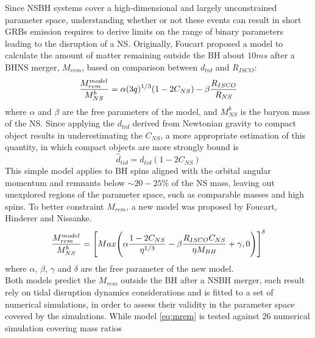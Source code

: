 \documentclass[binding=0.6cm, LaM]{sapthesis}
\begin{document}
        Since NSBH systems cover a high-dimensional and largely unconstrained parameter space,
        understanding whether or not these events can result in short GRBs emission requires to
        derive limits on the range of binary parameters leading to the disruption of a NS.
        Originally, Foucart proposed a model to calculate the amount of matter remaining
        outside the BH about $10ms$ after a BHNS merger, $M_{rem}$, based on comparison
        between $d_{tid}$ and $R_{ISCO}$:
                \begin{equation}
                \label{eq:mrem}
                        {{M_{rem}^{model}} \over {M^b_{NS}}} = \alpha(3q)^{1/3}(1 - 2C_{NS}) - \beta{{R_{ISCO}} \over {R_{NS}}}
                \end{equation}
        where $\alpha$ and $\beta$ are the free parameters of the model,
        and $M^b_{NS}$ is the baryon mass of the NS.
        Since applying the $d_{tid}$ derived from Newtonian gravity to compact object results in underestimating the $C_{NS}$,
        a more appropriate estimation of this quantity, in which compact objects are more strongly bound is
                \begin{equation}
                       \hat{d}_{tid} = d_{tid} (1 - 2C_{NS})
                \end{equation}
        This simple model applies to BH spins aligned with the orbital angular momentum and remnants below
        $\sim 20-25\%$ of the NS mass, leaving out unexplored regions of the parameter space,
        such as comparable masses and high spins.
        To better constraint $M_{rem}$, a new model was proposed by Foucart, Hinderer and Nissanke.
                \begin{equation}
                \label{eq:mremup}  
                        {{M_{rem}^{model}} \over {M^b_{NS}}} = \Bigg[ Max \Bigg( \alpha{{1 - 2C_{NS}} \over {\eta^{1/3}}} - \beta {{R_{ISCO}C_{NS}} \over{\eta M_{BH}}} + \gamma, 0 \Bigg)\Bigg]^{\delta}
                \end{equation}
        where $\alpha$, $\beta$, $\gamma$ and $\delta$ are the free parameter of the new model. \\
        Both models predict the $M_{rem}$ outside the BH after a NSBH merger,
        each result rely on tidal disruption dynamics considerations and
        is fitted to a set of numerical simulations,
        in order to assess their validity in the parameter space covered by the simulations.
        While model \ref{eq:mrem} is tested against 26 numerical simulation covering mass ratios
\end{document}
